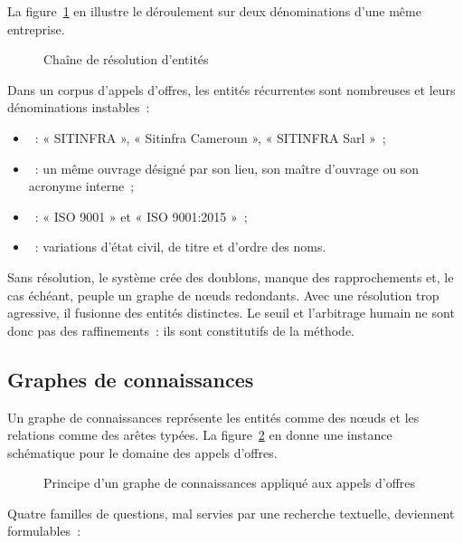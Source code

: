 La figure~\ref{fig:resolution-entites} en illustre le déroulement sur deux
dénominations d'une même entreprise.

\begin{figure}[htbp]
  \centering
  \resizebox{0.92\linewidth}{!}{}
  \caption{Chaîne de résolution d'entités}
  \label{fig:resolution-entites}
\end{figure}

Dans un corpus d'appels d'offres, les entités récurrentes sont nombreuses
et leurs dénominations instables~:

\begin{itemize}
  \item {}~: « SITINFRA », « Sitinfra Cameroun »,
        « SITINFRA Sarl »~;
  \item {}~: un même ouvrage désigné par son lieu, son maître
        d'ouvrage ou son acronyme interne~;
  \item {}~: « ISO 9001 » et « ISO 9001:2015 »~;
  \item {}~: variations d'état civil, de titre et d'ordre
        des noms.
\end{itemize}

Sans résolution, le système crée des doublons, manque des rapprochements
et, le cas échéant, peuple un graphe de n\oe uds redondants. Avec une
résolution trop agressive, il fusionne des entités distinctes. Le seuil
et l'arbitrage humain ne sont donc pas des raffinements~: ils sont
constitutifs de la méthode.

\subsection{Graphes de connaissances}

Un graphe de connaissances représente les entités comme des n\oe uds et
les relations comme des arêtes typées. La figure~\ref{fig:graphe}
en donne une instance schématique pour le domaine des appels d'offres.

\begin{figure}[htbp]
  \centering
  \resizebox{\linewidth}{!}{}
  \caption{Principe d'un graphe de connaissances appliqué aux appels d'offres}
  \label{fig:graphe}
\end{figure}

Quatre familles de questions, mal servies par une recherche textuelle,
deviennent formulables~:

